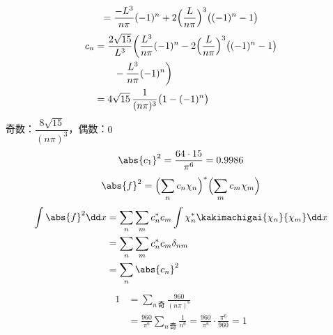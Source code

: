 \[ =\frac{-L^{3}}{n\pi}(-1)^{n}+2\Bigl(\frac{L}{n\pi}\Bigr)^{3}\bigl((-1)^{n}-1\bigr) \]
\begin{align*}
c_{n}&=\frac{2\sqrt{15}}{L^{3}}\biggl(\frac{L^{3}}{n\pi}(-1)^{n}-2\Bigl(\frac{L}{n\pi}\Bigr)^{3}\bigl((-1)^{n}-1\bigr)\\
&\qquad-\frac{L^{3}}{n\pi}(-1)^{n}\biggr)\\
&=4\sqrt{15}\,\frac{1}{(n\pi)^{3}}\bigl(1-(-1)^{n}\bigr)
\end{align*}
奇数：$\dfrac{8\sqrt{15}}{(n\pi)^{3}}$，偶数：$0$
\[ \abs{c_{1}}^{2}=\frac{64\cdot15}{\pi^{6}}=0.9986 \]
\[ \abs{f}^{2}=\Bigl(\sum_{n}c_{n}\chi_{n}\Bigr)^{*}\Bigl(\sum_{m}c_{m}\chi_{m}\Bigr) \]
\begin{align*}
\int\abs{f}^{2}\dd x&=\sum_{n}\sum_{m}c_{n}^{*}c_{m}\int\chi_{n}^{*}\kakimachigai{\chi_{n}}{\chi_{m}}\dd x\\
&=\sum_{n}\sum_{m}c_{n}^{*}c_{m}\delta_{nm}\\
&=\sum_{n}\abs{c_{n}}^{2}
\end{align*}
\begin{align*}
1&=\sum_{n\,\text{奇}}\frac{960}{(n\pi)^{6}}\\
&=\frac{960}{\pi^{6}}\sum_{n\,\text{奇}}\frac{1}{n^{6}}=\frac{960}{\pi^{6}}\cdot\frac{\pi^{6}}{960}=1
\end{align*}
